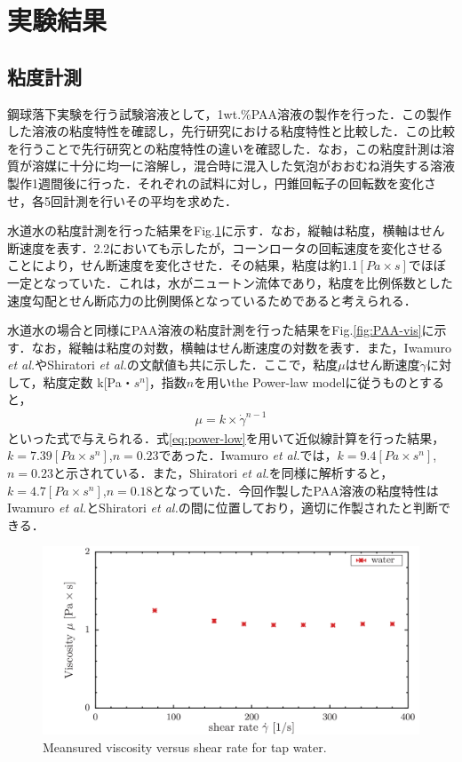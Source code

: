 \section{実験結果}
\subsection{粘度計測}
鋼球落下実験を行う試験溶液として，1wt.\%PAA溶液の製作を行った．この製作した溶液の粘度特性を確認し，先行研究\cite{ref:9}\cite{ref:10}における粘度特性と比較した．この比較を行うことで先行研究との粘度特性の違いを確認した．なお，この粘度計測は溶質が溶媒に十分に均一に溶解し，混合時に混入した気泡がおおむね消失する溶液製作1週間後に行った．それぞれの試料に対し，円錐回転子の回転数を変化させ，各5回計測を行いその平均を求めた．

水道水の粘度計測を行った結果をFig.\ref{fig:water-vis}に示す．なお，縦軸は粘度，横軸はせん断速度を表す．2.2においても示したが，コーンロータの回転速度を変化させることにより，せん断速度を変化させた．その結果，粘度は約1.1$\left[Pa\times s\right]$でほぼ一定となっていた．これは，水がニュートン流体であり，粘度を比例係数とした速度勾配とせん断応力の比例関係となっているためであると考えられる．

水道水の場合と同様にPAA溶液の粘度計測を行った結果をFig.\ref{fig:PAA-vis}に示す．なお，縦軸は粘度の対数，横軸はせん断速度の対数を表す．また，Iwamuro {\it et al.}\cite{ref:9}やShiratori {\it et al.}\cite{ref:10}の文献値も共に示した．ここで，粘度$\mu$はせん断速度$\dot{\gamma}$に対して，粘度定数 k[Pa・$s^n$]，指数$n$を用いthe Power-law modelに従うものとすると，
\begin{eqnarray}
    \label{eq:power-low}
    \mu=k\times\dot{\gamma}^{n-1}
\end{eqnarray}
といった式で与えられる\cite{ref:1}．式\ref{eq:power-low}を用いて近似線計算を行った結果，$k=7.39[Pa\times s^n]$,$n=0.23$であった．Iwamuro {\it et al.}\cite{ref:9}では，$k=9.4[Pa\times s^n]$,$n=0.23$と示されている．また，Shiratori {\it et al.}\cite{ref:10}を同様に解析すると，$k=4.7[Pa\times s^n]$,$n=0.18$となっていた．今回作製したPAA溶液の粘度特性はIwamuro {\it et al.}とShiratori {\it et al.}の間に位置しており，適切に作製されたと判断できる．

\begin{figure}[ht]
    \centering
    \includegraphics[width=12cm,clip]{4-Results/water.png}
    \caption{Meansured viscosity versus shear rate for tap water.}
    \label{fig:water-vis}
\end{figure}

